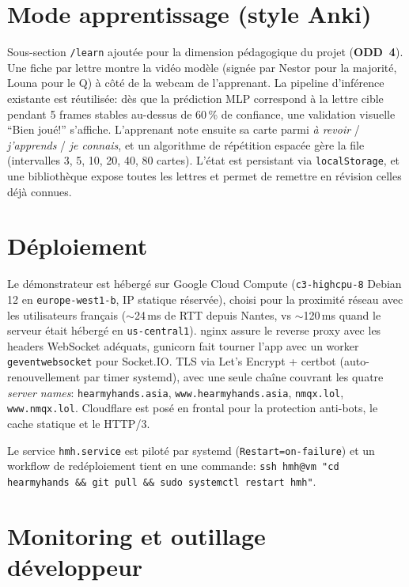 \documentclass[11pt,a4paper]{article}
\begin{document}
\section{Mode apprentissage (style Anki)}

Sous-section \texttt{/learn} ajoutée pour la dimension pédagogique du projet
(\textbf{ODD~4}). Une fiche par lettre montre la vidéo modèle (signée par Nestor pour la
majorité, Louna pour le Q) à côté de la webcam de l'apprenant. La pipeline d'inférence
existante est réutilisée: dès que la prédiction MLP correspond à la lettre cible
pendant 5 frames stables au-dessus de 60\,\% de confiance, une validation visuelle
``Bien joué!'' s'affiche. L'apprenant note ensuite sa carte parmi
\textit{à revoir} / \textit{j'apprends} / \textit{je connais}, et un algorithme de
répétition espacée gère la file (intervalles 3, 5, 10, 20, 40, 80 cartes). L'état est
persistant via \texttt{localStorage}, et une bibliothèque expose toutes les lettres et
permet de remettre en révision celles déjà connues.

\section{Déploiement}

Le démonstrateur est hébergé sur Google Cloud Compute (\texttt{c3-highcpu-8} Debian 12
en \texttt{europe-west1-b}, IP statique réservée), choisi pour la proximité réseau avec
les utilisateurs français ($\sim$24\,ms de RTT depuis Nantes, vs $\sim$120\,ms quand le
serveur était hébergé en \texttt{us-central1}). nginx assure le reverse proxy avec les
headers WebSocket adéquats, gunicorn fait tourner l'app avec un worker
\texttt{geventwebsocket} pour Socket.IO. TLS via Let's Encrypt + certbot
(auto-renouvellement par timer systemd), avec une seule chaîne couvrant les quatre
\textit{server names}: \texttt{hearmyhands.asia}, \texttt{www.hearmyhands.asia},
\texttt{nmqx.lol}, \texttt{www.nmqx.lol}. Cloudflare est posé en frontal pour la
protection anti-bots, le cache statique et le HTTP/3.

Le service \texttt{hmh.service} est piloté par systemd (\texttt{Restart=on-failure})
et un workflow de redéploiement tient en une commande:
\texttt{ssh hmh@vm "cd hearmyhands \&\& git pull \&\& sudo systemctl restart hmh"}.

\section{Monitoring et outillage développeur}
\end{document}
